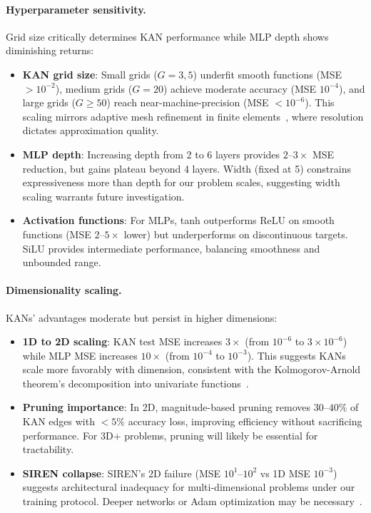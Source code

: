 \documentclass[11pt,a4paper]{article}
\begin{document}
\paragraph{Hyperparameter sensitivity.} Grid size critically determines KAN performance while MLP depth shows diminishing returns:
\begin{itemize}
    \item \textbf{KAN grid size}: Small grids ($G=3,5$) underfit smooth functions (MSE $>10^{-2}$), medium grids ($G=20$) achieve moderate accuracy (MSE $10^{-4}$), and large grids ($G \geq 50$) reach near-machine-precision (MSE $<10^{-6}$). This scaling mirrors adaptive mesh refinement in finite elements~\citep{huang2011adaptive}, where resolution dictates approximation quality.
    \item \textbf{MLP depth}: Increasing depth from 2 to 6 layers provides $2$--$3\times$ MSE reduction, but gains plateau beyond 4 layers. Width (fixed at 5) constrains expressiveness more than depth for our problem scales, suggesting width scaling warrants future investigation.
    \item \textbf{Activation functions}: For MLPs, tanh outperforms ReLU on smooth functions (MSE $2$--$5\times$ lower) but underperforms on discontinuous targets. SiLU provides intermediate performance, balancing smoothness and unbounded range.
\end{itemize}

\paragraph{Dimensionality scaling.} KANs' advantages moderate but persist in higher dimensions:
\begin{itemize}
    \item \textbf{1D to 2D scaling}: KAN test MSE increases $3\times$ (from $10^{-6}$ to $3 \times 10^{-6}$) while MLP MSE increases $10\times$ (from $10^{-4}$ to $10^{-3}$). This suggests KANs scale more favorably with dimension, consistent with the Kolmogorov-Arnold theorem's decomposition into univariate functions~\citep{liu2024kan}.
    \item \textbf{Pruning importance}: In 2D, magnitude-based pruning removes $30$--$40\%$ of KAN edges with $<5\%$ accuracy loss, improving efficiency without sacrificing performance. For 3D+ problems, pruning will likely be essential for tractability.
    \item \textbf{SIREN collapse}: SIREN's 2D failure (MSE $10^1$--$10^2$ vs 1D MSE $10^{-3}$) suggests architectural inadequacy for multi-dimensional problems under our training protocol. Deeper networks or Adam optimization may be necessary~\citep{sitzmann2020implicit}.
\end{itemize}
\end{document}
